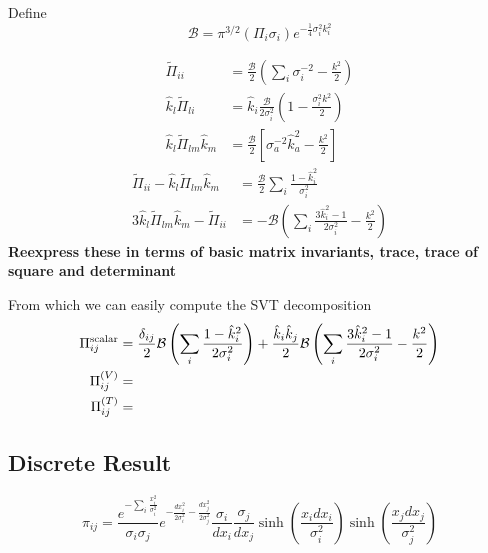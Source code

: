 \documentclass{revtex4}
\newcommand{\aAsym}{\ensuremath{\mathcal{B}}}
\begin{document}
Define
\begin{equation}
  \aAsym = \pi^{3/2}\left(\Pi_i\sigma_i\right)e^{-\frac{1}{4}\sigma_i^2k_i^2}
\end{equation}

\begin{subequations}
\begin{align}
  \tilde{\Pi}_{ii} &= \frac{\aAsym}{2}\left(\sum_i\sigma_i^{-2} - \frac{k^2}{2}\right) \\
  \hat{k}_l\tilde{\Pi}_{li} &= \hat{k}_i\frac{\aAsym}{2\sigma_i^2}\left(1-\frac{\sigma_i^2k^2}{2}\right) \\
  \hat{k}_l\tilde{\Pi}_{lm}\hat{k}_m &= \frac{\aAsym}{2}\left[\sigma_a^{-2}\hat{k}_a^2 -\frac{k^2}{2}\right] 
\end{align}
\end{subequations}
\begin{align}
  \tilde{\Pi}_{ii} - \hat{k}_l\tilde{\Pi}_{lm}\hat{k}_m &= \frac{\aAsym}{2}\sum_i\frac{1-\hat{k}_i^2}{\sigma_i^2}\\
  3\hat{k}_l\tilde{\Pi}_{lm}\hat{k}_m - \tilde{\Pi}_{ii} &= -\aAsym\left(\sum_i\frac{3\hat{k}_i^2-1}{2\sigma_i^2} - \frac{k^2}{2}\right)
\end{align}
    {\bf Reexpress these in terms of basic matrix invariants, trace, trace of square and determinant}
    

From which we can easily compute the SVT decomposition
\begin{subequations}
  \begin{align}
    \Pi_{ij}^{\rm scalar} &= \frac{\delta_{ij}}{2}\aAsym\left(\sum_i\frac{1-\hat{k}_i^2}{2\sigma_i^2} \right) + \frac{\hat{k}_i\hat{k}_j}{2}\aAsym\left(\sum_i\frac{3\hat{k}_i^2-1}{2\sigma_i^2}-\frac{k^2}{2}\right)\\
    \Pi_{ij}^{(V)} &= \\
    \Pi_{ij}^{(T)} &=
  \end{align}
\end{subequations}


\subsection{Discrete Result}
\begin{equation}
  \pi_{ij} = \frac{e^{-\sum_i\frac{x_i^2}{\sigma_i^2}}}{\sigma_i\sigma_j}e^{-\frac{dx_i^2}{2\sigma_i^2}-\frac{dx_j^2}{2\sigma_j^2}}\frac{\sigma_i}{dx_i}\frac{\sigma_j}{dx_j}\sinh\left(\frac{x_idx_i}{\sigma_i^2}\right)\sinh\left(\frac{x_jdx_j}{\sigma_j^2}\right)
\end{equation}
\end{document}
